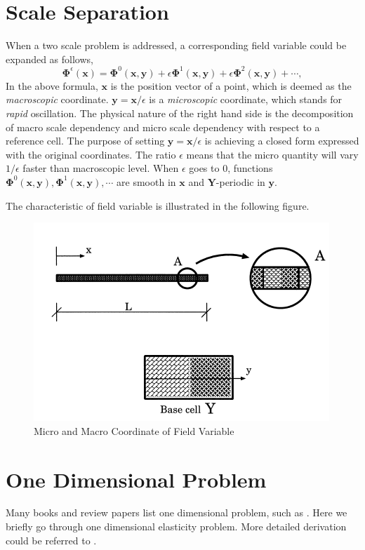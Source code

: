 \documentclass[10pt,a4paper]{scrreprt}
\begin{document}
\section{Scale Separation}
When a two scale problem is addressed, a corresponding field variable could be expanded as follows, 
%
\begin{equation}
\label{eq:field epsi}
\mathbf{\Phi}^{\epsilon}(\mathbf{x}) = \mathbf{\Phi}^{0}(\mathbf{x},\mathbf{y}) + \epsilon\mathbf{\Phi}^{1}(\mathbf{x},\mathbf{y}) + \epsilon\mathbf{\Phi}^{2}(\mathbf{x},\mathbf{y}) + \cdots,
\end{equation}
%
In the above formula, $\mathbf{x}$ is the position vector of a point, which is deemed as the \textit{macroscopic} coordinate. $\mathbf{y}=\mathbf{x}/\epsilon$ is a \textit{microscopic} coordinate, which stands for \textit{rapid} oscillation. The physical nature of the right hand side is the decomposition of macro scale dependency and micro scale dependency with respect to a reference cell. The purpose of setting $\mathbf{y}=\mathbf{x}/\epsilon$ is achieving a closed form expressed with the original coordinates. The ratio $\epsilon$ means that the micro quantity will vary $1/\epsilon$ faster than macroscopic level. When $\epsilon$ goes to $0$, functions $\mathbf{\Phi}^{0}(\mathbf{x}, \mathbf{y}), \mathbf{\Phi}^{1}(\mathbf{x}, \mathbf{y}), \cdots$ are smooth in $\mathbf{x}$ and $\mathbf{Y}$-periodic in $\mathbf{y}$.

The characteristic of field variable is illustrated in the following figure.

\begin{figure}[h]
  \centering
    \label{fig: scale sepa}
    \includegraphics[width=0.45\linewidth]{../pics/ref_cell_mic_mac_coord.png}
  \caption{Micro and Macro Coordinate of Field Variable \citep{hassani1998review}}
\end{figure}

\section{One Dimensional Problem}
Many books and review papers list one dimensional problem, such as \citep{cioranescu2000introduction}. Here we briefly go through one dimensional elasticity problem. More detailed derivation could be referred to \citep{hassani1998review}.
\end{document}
